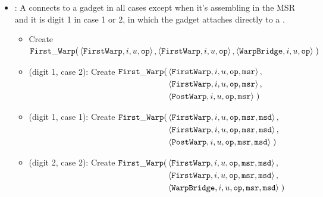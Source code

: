 \begin{itemize}
        \item {\firstwarp}: A {\firstwarp} connects to a {\warpbridge} gadget in all cases except when it's assembling
              in the MSR and it is digit 1 in case 1 or 2, in which the {\firstwarp} gadget attaches directly
              to a {\postwarp}.

              \begin{itemize}

                \item Create
                $\begin{aligned}[t]
                    {\tt First\_Warp}(& \left\langle {\tt FirstWarp},  i, u, {\tt op} \right\rangle,
                                 \left\langle {\tt FirstWarp},  i, u, {\tt op} \right\rangle,
                                 \left\langle {\tt WarpBridge}, i, u, {\tt op} \right\rangle \;)
                \end{aligned}$
                \vspace{.5cm}

                \item (digit 1, case 2): Create
                $\begin{aligned}[t]
                    {\tt First\_Warp}(& \left\langle {\tt FirstWarp}, i, u, {\tt op}, {\tt msr} \right\rangle, \\
                               & \left\langle {\tt FirstWarp}, i, u, {\tt op}, {\tt msr} \right\rangle, \\
                               & \left\langle {\tt PostWarp},  i, u, {\tt op}, {\tt msr} \right\rangle \;)
                \end{aligned}$
                \vspace{.5cm}

                \item (digit 1, case 1): Create
                $\begin{aligned}[t]
                    {\tt First\_Warp}(& \left\langle {\tt FirstWarp}, i, u, {\tt op}, {\tt msr}, {\tt msd} \right\rangle, \\
                               & \left\langle {\tt FirstWarp}, i, u, {\tt op}, {\tt msr}, {\tt msd} \right\rangle, \\
                               & \left\langle {\tt PostWarp},  i, u, {\tt op}, {\tt msr}, {\tt msd} \right\rangle \;)
                \end{aligned}$
                \vspace{.5cm}

                \item (digit 2, case 2): Create
                $\begin{aligned}[t]
                    {\tt First\_Warp}(& \left\langle {\tt FirstWarp},  i, u, {\tt op}, {\tt msr}, {\tt msd} \right\rangle, \\
                               & \left\langle {\tt FirstWarp},  i, u, {\tt op}, {\tt msr}, {\tt msd} \right\rangle, \\
                               & \left\langle {\tt WarpBridge}, i, u, {\tt op}, {\tt msr}, {\tt msd} \right\rangle \;)
                \end{aligned}$
                \vspace{.5cm}


\end{itemize}
\end{itemize}
